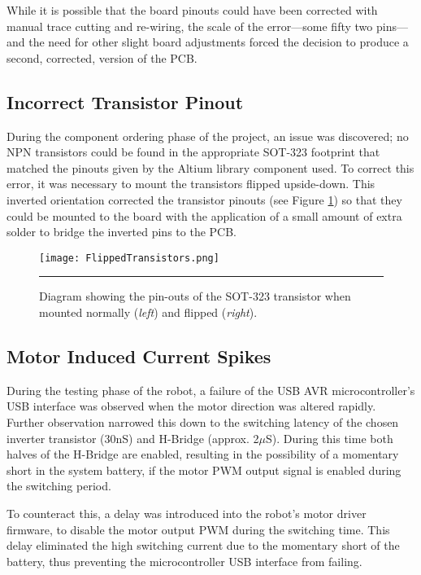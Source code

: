 While it is possible that the board pinouts could have been corrected with manual trace cutting and re-wiring, the scale of the error---some fifty two pins---and the need for other slight board adjustments forced the decision to produce a second, corrected, version of the PCB.

\FloatBarrier
\subsection{Incorrect Transistor Pinout}

During the component ordering phase of the project, an issue was discovered; no NPN transistors could be found in the appropriate SOT-323 footprint that matched the pinouts given by the Altium library component used. To correct this error, it was necessary to mount the transistors flipped upside-down. This inverted orientation corrected the transistor pinouts (see Figure \ref{fig:flippedtransistor}) so that they could be mounted to the board with the application of a small amount of extra solder to bridge the inverted pins to the PCB.

\begin{figure}[tbph]
	\centering
		\texttt{[image: FlippedTransistors.png]}
	\rule{35em}{0.5pt}
	\caption[Diagram of the normal and flipped SOT-323 Transistor]{Diagram showing the pin-outs of the SOT-323 transistor when mounted normally (\textit{left}) and flipped (\textit{right}).}
	\label{fig:flippedtransistor}
\end{figure}

\FloatBarrier
\subsection{Motor Induced Current Spikes}

During the testing phase of the robot, a failure of the USB AVR microcontroller's USB interface was observed when the motor direction was altered rapidly. Further observation narrowed this down to the switching latency of the chosen inverter transistor (30nS) and H-Bridge (approx. 2$\mu$S). During this time both halves of the H-Bridge are enabled, resulting in the possibility of a momentary short in the system battery, if the motor PWM output signal is enabled during the switching period.

To counteract this, a delay was introduced into the robot's motor driver firmware, to disable the motor output PWM during the switching time. This delay eliminated the high switching current due to the momentary short of the battery, thus preventing the microcontroller USB interface from failing.

